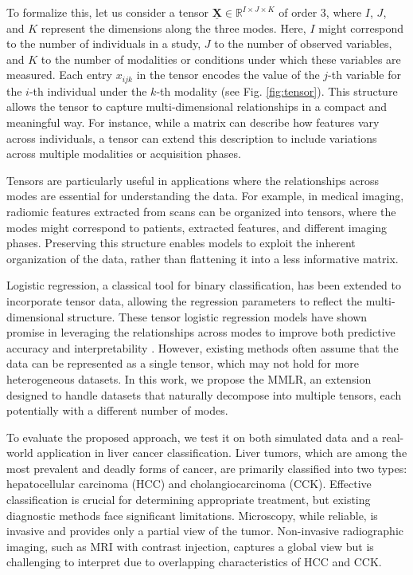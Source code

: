 \documentclass[preprint,12pt]{elsarticle}
\begin{document}
To formalize this, let us consider a tensor \(\underline{\mathbf{X}} \in \mathbb{R}^{I \times J \times K}\) of order 3, where \(I\), \(J\), and \(K\) represent the dimensions along the three modes. Here, \(I\) might correspond to the number of individuals in a study, \(J\) to the number of observed variables, and \(K\) to the number of modalities or conditions under which these variables are measured. Each entry \(x_{ijk}\) in the tensor encodes the value of the \(j\)-th variable for the \(i\)-th individual under the \(k\)-th modality (see Fig. \ref{fig:tensor}). This structure allows the tensor to capture multi-dimensional relationships in a compact and meaningful way. For instance, while a matrix can describe how features vary across individuals, a tensor can extend this description to include variations across multiple modalities or acquisition phases. 

Tensors are particularly useful in applications where the relationships across modes are essential for understanding the data. For example, in medical imaging, radiomic features extracted from scans can be organized into tensors, where the modes might correspond to patients, extracted features, and different imaging phases. Preserving this structure enables models to exploit the inherent organization of the data, rather than flattening it into a less informative matrix.

Logistic regression, a classical tool for binary classification, has been extended to incorporate tensor data, allowing the regression parameters to reflect the multi-dimensional structure. These tensor logistic regression models have shown promise in leveraging the relationships across modes to improve both predictive accuracy and interpretability \cite{multi_rank_1, multi_rank_r}. However, existing methods often assume that the data can be represented as a single tensor, which may not hold for more heterogeneous datasets. In this work, we propose the MMLR, an extension designed to handle datasets that naturally decompose into multiple tensors, each potentially with a different number of modes.

To evaluate the proposed approach, we test it on both simulated data and a real-world application in liver cancer classification. Liver tumors, which are among the most prevalent and deadly forms of cancer, are primarily classified into two types: hepatocellular carcinoma (HCC) and cholangiocarcinoma (CCK). Effective classification is crucial for determining appropriate treatment, but existing diagnostic methods face significant limitations. Microscopy, while reliable, is invasive and provides only a partial view of the tumor. Non-invasive radiographic imaging, such as MRI with contrast injection, captures a global view but is challenging to interpret due to overlapping characteristics of HCC and CCK. 
\end{document}
